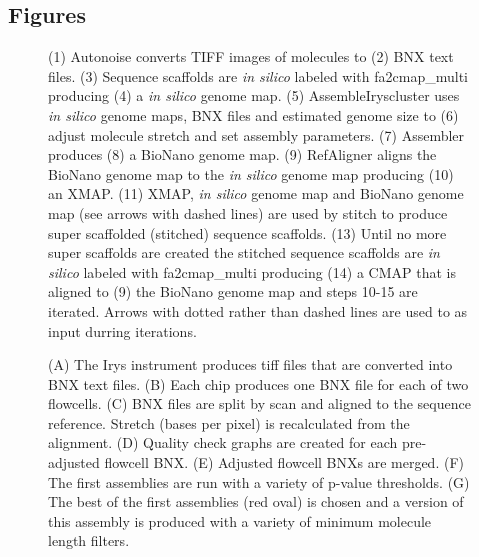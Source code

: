 \documentclass{bmcart}
\begin{document}
\begin{backmatter}

\section*{Figures}
  \begin{figure}[h!]
  	\caption{
  		(1) Autonoise converts TIFF images of molecules to (2) BNX text files. (3) Sequence scaffolds are \textit{in silico} labeled with fa2cmap\_multi producing (4) a \textit{in silico} genome map. (5) AssembleIryscluster uses \textit{in silico} genome maps, BNX files and estimated genome size to (6) adjust molecule stretch and set assembly parameters. (7) Assembler produces (8) a BioNano genome map. (9) RefAligner aligns the BioNano genome map to the \textit{in silico} genome map producing (10) an XMAP. (11) XMAP, \textit{in silico} genome map and BioNano genome map (see arrows with dashed lines) are used by stitch to produce super scaffolded (stitched) sequence scaffolds. (13) Until no more super scaffolds are created the stitched sequence scaffolds are \textit{in silico} labeled with fa2cmap\_multi producing (14) a CMAP that is aligned to (9) the BioNano genome map and steps 10-15 are iterated. Arrows with dotted rather than dashed lines are used to as input durring iterations.}
  \end{figure}
  \begin{figure}[h!]
  	\caption{
  		(A) The Irys instrument produces tiff files that are converted into BNX text files. (B) Each chip produces one BNX file for each of two flowcells. (C) BNX files are split by scan and aligned to the sequence reference. Stretch (bases per pixel) is recalculated from the alignment. (D) Quality check graphs are created for each pre-adjusted flowcell BNX. (E) Adjusted flowcell BNXs are merged. (F) The first assemblies are run with a variety of p-value thresholds. (G) The best of the first assemblies (red oval) is chosen and a version of this assembly is produced with a variety of minimum molecule length filters.}
  \end{figure}
  \begin{figure}[h!]
  \caption{
}
\end{figure}
\end{backmatter}
\end{document}
